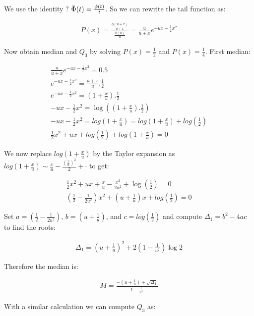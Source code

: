 \documentclass{article}
\begin{document}
We use the identity ? $\Bar \Phi(t) = \frac{\phi(t)}{t}$. So we can rewrite the tail function as:

\begin{align}
    P(x) = \frac{ \frac{\phi(u+x)}{u+x} }{ \frac{\phi(u)}{u} } = \frac{u}{u+x} e^{-ux - \frac{1}{2} x^2 }
\end{align}

Now obtain median and $Q_3$ by solving $P(x)=\frac{1}{2}$ and $P(x) = \frac{1}{4}$. First median:

\begin{align}
\frac{u}{u+x} e^{-ux - \frac{1}{2} x^2 } = 0.5 \\
e^{-ux - \frac{1}{2} x^2 } = \frac{u+x}{u} . \frac{1}{2} \\
e^{-ux - \frac{1}{2} x^2 } = (1 + \frac{x}{u}) . \frac{1}{2} \\
-ux - \frac{1}{2} x^2 = \log((1 + \frac{x}{u}) . \frac{1}{2}) \\
-ux - \frac{1}{2} x^2 = log(1 + \frac{x}{u}) = log(1 + \frac{x}{u}) + log(\frac{1}{2}) \\
\frac{1}{2} x^{2} + ux + log(\frac{1}{2}) + log(1 + \frac{x}{u}) = 0
\end{align}

We now replace $log(1 + \frac{x}{u})$ by the Taylor expansion as $log(1 + \frac{x}{u}) \sim \frac{x}{u} - \frac{ (\frac{x}{u})^2 }{2} + \cdot$ to get:

\begin{align}
\frac{1}{2} x^{2} + ux + \frac{x}{u} - \frac{x^2}{2u^2} + \log(\frac{1}{2}) = 0 \\
\left( \frac{1}{2} - \frac{1}{2u^2} \right) x^2 + \left( u + \frac{1}{u} \right) x + log(\frac{1}{2}) = 0
\end{align}

Set $a = \left( \frac{1}{2} - \frac{1}{2u^2} \right)$, $b = \left( u + \frac{1}{u} \right)$, and $c = log(\frac{1}{2})$ and compute $\Delta_1 = b^2  - 4ac$ to find the roots:

\begin{align}
    \Delta_{1} = \left( u + \frac{1}{u} \right)^{2} + 2 \left( 1 - \frac{1}{u^2} \right) \log{2}
\end{align}

Therefore the median is:

\begin{align}
    M = \frac{-(u+\frac{1}{u}) + \sqrt{\Delta_1}}{1 - \frac{1}{u^2}}
\end{align}

With a similar calculation we can compute $Q_3$ as:
\end{document}
